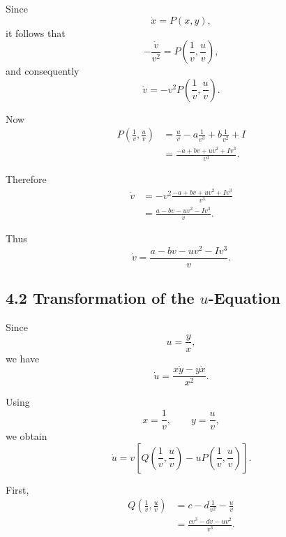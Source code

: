 \documentclass[11pt,a4paper]{article}
\begin{document}
Since
\begin{equation}
\dot{x}=P(x,y),
\end{equation}
it follows that
\begin{equation}
-\frac{\dot v}{v^2}
=
P\left(\frac1v,\frac{u}{v}\right),
\end{equation}
and consequently
\begin{equation}
\boxed{
\dot v
=
-v^2P\left(\frac1v,\frac{u}{v}\right).
}
\tag{14}
\end{equation}

Now
\begin{align}
P\left(\frac1v,\frac{u}{v}\right)
&=
\frac{u}{v}
-a\frac{1}{v^3}
+b\frac{1}{v^2}
+I\\
&=
\frac{-a+bv+uv^2+Iv^3}{v^3}.
\end{align}

Therefore
\begin{align}
\dot v
&=
-v^2
\frac{-a+bv+uv^2+Iv^3}{v^3}\\
&=
\frac{a-bv-uv^2-Iv^3}{v}.
\end{align}

Thus
\begin{equation}
\boxed{
\dot v
=
\frac{a-bv-uv^2-Iv^3}{v}.
}
\tag{15}
\end{equation}

\subsection{4.2 Transformation of the $u$-Equation}

Since
\begin{equation}
u=\frac{y}{x},
\end{equation}
we have
\begin{equation}
\dot u
=
\frac{x\dot y-y\dot x}{x^2}.
\end{equation}

Using
\begin{equation}
x=\frac1v,\qquad
y=\frac{u}{v},
\end{equation}
we obtain
\begin{equation}
\boxed{
\dot u
=
v\left[
Q\left(\frac1v,\frac{u}{v}\right)
-
uP\left(\frac1v,\frac{u}{v}\right)
\right].
}
\tag{16}
\end{equation}

First,
\begin{align}
Q\left(\frac1v,\frac{u}{v}\right)
&=
c-d\frac1{v^2}-\frac{u}{v}\\
&=
\frac{cv^3-dv-uv^2}{v^3}.
\end{align}
\end{document}
